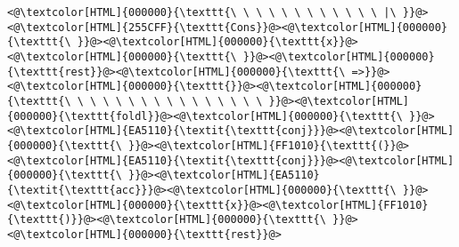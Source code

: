 \begin{lstlisting}
<@\textcolor[HTML]{000000}{\texttt{\ \ \ \ \ \ \ \ \ \ \ \ |\ }}@><@\textcolor[HTML]{255CFF}{\texttt{Cons}}@><@\textcolor[HTML]{000000}{\texttt{\ }}@><@\textcolor[HTML]{000000}{\texttt{x}}@><@\textcolor[HTML]{000000}{\texttt{\ }}@><@\textcolor[HTML]{000000}{\texttt{rest}}@><@\textcolor[HTML]{000000}{\texttt{\ =>}}@>
<@\textcolor[HTML]{000000}{\texttt{}}@><@\textcolor[HTML]{000000}{\texttt{\ \ \ \ \ \ \ \ \ \ \ \ \ \ \ \ }}@><@\textcolor[HTML]{000000}{\texttt{foldl}}@><@\textcolor[HTML]{000000}{\texttt{\ }}@><@\textcolor[HTML]{EA5110}{\textit{\texttt{conj}}}@><@\textcolor[HTML]{000000}{\texttt{\ }}@><@\textcolor[HTML]{FF1010}{\texttt{(}}@><@\textcolor[HTML]{EA5110}{\textit{\texttt{conj}}}@><@\textcolor[HTML]{000000}{\texttt{\ }}@><@\textcolor[HTML]{EA5110}{\textit{\texttt{acc}}}@><@\textcolor[HTML]{000000}{\texttt{\ }}@><@\textcolor[HTML]{000000}{\texttt{x}}@><@\textcolor[HTML]{FF1010}{\texttt{)}}@><@\textcolor[HTML]{000000}{\texttt{\ }}@><@\textcolor[HTML]{000000}{\texttt{rest}}@>

\end{lstlisting}
